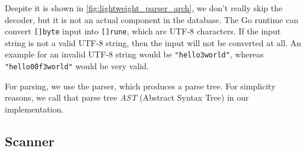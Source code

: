 Despite it is shown in \autoref{fig:lightweight_parser_arch}, we don't really skip the decoder, but it is not an actual component in the database.
The Go runtime can convert \texttt{[]byte} input into \texttt{[]rune}, which are UTF-8 characters.
If the input string is not a valid UTF-8 string, then the input will not be converted at all.
An example for an invalid UTF-8 string would be \texttt{"hello\xf3world"}, whereas \texttt{"hello\u00f3world"} would be very valid.

For parsing, we use the parser, which produces a parse tree.
For simplicity reasons, we call that parse tree \textit{AST} (Abstract Syntax Tree) in our implementation.

\subsection{Scanner}
\label{sec:scanner}